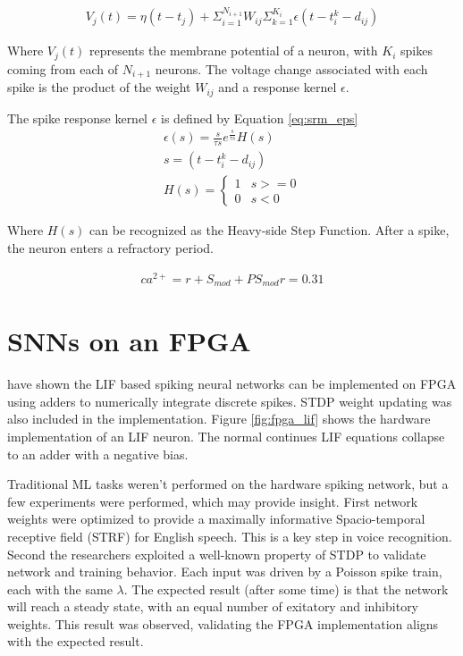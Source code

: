     \begin{align}
        V_j(t) = \eta(t - t_j) + \Sigma^{N_{i+1}}_{i=1}W_{ij}\Sigma^{K_i}_{k=1}
        \epsilon(t - t_i^k - d_{ij})
    \end{align}
    
    Where $V_j(t)$ represents the membrane potential of a neuron, with $K_i$
    spikes coming from each of $N_{i+1}$ neurons. The voltage change associated
    with each spike is the product of the weight $W_{ij}$ and a response kernel
    $\epsilon$.
    
    
    The spike response kernel $\epsilon$ is defined by Equation \ref{eq:srm_eps}
    \begin{align}
        \epsilon (s) = \frac{s}{\tau s} e^{\frac{s}{\tau s}}
        H(s) \label{eq:srm_eps} \\ s = (t - t_i^k - d_{ij}) \\ H(s) =
        \begin{cases} 
          1 & s >= 0 \\ 0 & s < 0
       \end{cases}
    \end{align}
    
    Where $H(s)$ can be recognized as the Heavy-side Step Function. After a
    spike, the neuron enters a refractory period.
        
    \begin{align}
        ca^{2+} = r + S_{mod} + PS_{mod} \label{eq:srm_astro_ca} r = 0.31
    \end{align}    
    
    \section{SNNs on an FPGA}
    \cite{cassidy_2017} have shown the LIF based spiking neural networks can be
    implemented on FPGA using adders to numerically integrate discrete
    spikes. STDP weight updating was also included in the implementation. Figure
    \ref{fig:fpga_lif} shows the hardware implementation of an LIF neuron. The
    normal continues LIF equations collapse to an adder with a negative bias.
    
    
    Traditional ML tasks weren't performed on the hardware spiking network, but
    a few experiments were performed, which may provide insight. First network
    weights were optimized to provide a maximally informative Spacio-temporal
    receptive field (STRF) for English speech. This is a key step in voice
    recognition. Second the researchers exploited a well-known property of STDP
    to validate network and training behavior. Each input was driven by a
    Poisson spike train, each with the same $\lambda$. The expected result
    (after some time) is that the network will reach a steady state, with an
    equal number of exitatory and inhibitory weights. This result was observed,
    validating the FPGA implementation aligns with the expected result.
    
